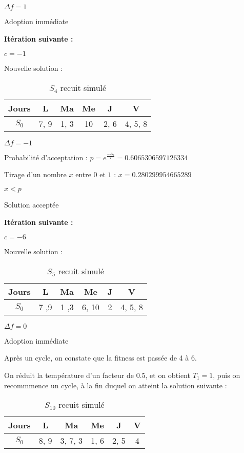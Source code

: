 {    $\Delta f = 1$

    Adoption immédiate

    \textbf{Itération suivante :}

    $c = -1$

    Nouvelle solution :

    \begin{table}[!h]
        \centering
        \begin{tabular}{|c|c|c|c|c|c|}
            \hline
            Jours & L    & Ma   & Me & J    & V       \\
            \hline
            $S_0$ & 7, 9 & 1, 3 & 10 & 2, 6 & 4, 5, 8 \\
            \hline
        \end{tabular}\caption{$S_4$ recuit simulé}
    \end{table}

    $\Delta f = -1$

    Probabilité d'acceptation :  $p = e^{\frac{-\Delta_f}{T}} = 0.6065306597126334$

    Tirage d'un nombre $x$ entre $0$ et $1$ :
    $x = 0.280299954665289$

    $x < p$

    Solution acceptée

    \textbf{Itération suivante :}

    $c = -6$

    Nouvelle solution :

    \begin{table}[!h]
        \centering
        \begin{tabular}{|c|c|c|c|c|c|}
            \hline
            Jours & L    & Ma   & Me    & J & V       \\
            \hline
            $S_0$ & 7 ,9 & 1 ,3 & 6, 10 & 2 & 4, 5, 8 \\
            \hline
        \end{tabular}\caption{$S_5$ recuit simulé}
    \end{table}

    $\Delta f = 0$

    Adoption immédiate

    Après un cycle, on constate que la fitness est passée de 4 à 6.

On réduit la température d'un facteur de $0.5$, et on obtient $T_1 = 1$, puis on recommmence un cycle, à la fin duquel on atteint la solution suivante :

    \begin{table}[!h]
        \centering
        \begin{tabular}{|c|c|c|c|c|c|}
            \hline
            Jours & L    & Ma      & Me   & J    & V \\
            \hline
            $S_0$ & 8, 9 & 3, 7, 3 & 1, 6 & 2, 5 & 4 \\
            \hline
        \end{tabular}\caption{$S_{10}$ recuit simulé}
    \end{table}

}
